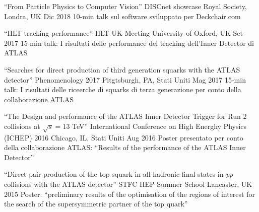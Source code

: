 \begin{cventries}
  \cventry
    {``From Particle Physics to Computer Vision''}
    {DISCnet showcase}
    {Royal Society, Londra, UK}
    {Dic 2018}
    {10-min talk sul software sviluppato per Deckchair.com}

  \cventry
    {``HLT tracking performance''}
    {HLT-UK Meeting}
    {University of Oxford, UK}
    {Set 2017}
    {15-min talk: I risultati delle performance del tracking dell'Inner Detector di ATLAS }

  \cventry
    {``Searches for direct production of third generation squarks with the ATLAS detector''}  
    {Phenomenology 2017}
    {Pitgtsburgh, PA, Stati Uniti}
    {Mag 2017}
    {15-min talk: I risultati delle riceerche di squarks di terza generazione per conto della collaborazione ATLAS}

  \cventry
    {``The Design and performance of the ATLAS Inner Detector Trigger for Run 2 collisions at $\sqrt{s} = 13$ TeV''}
    {International Conference on High Energhy Physics (ICHEP) 2016}
    {Chicago, IL, Stati Uniti}
    {Aug 2016}
    {Poster presentato per conto della collaborazione ATLAS: ``Results of the performance of the ATLAS Inner Detector''}

  \cventry
    {``Direct pair production of the top squark in all-hadronic final states in \emph{pp} collisions with the ATLAS detector''}
    {STFC HEP Summer School}
    {Lancaster, UK}
    {2015}
    {Poster: ``preliminary results of the optimisation of the regions of interest for the search of the supersymmetric partner of the top quark''}

\end{cventries}